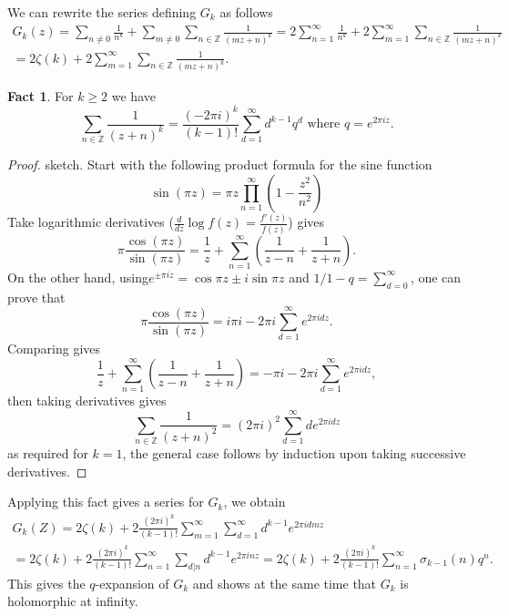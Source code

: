 \documentclass{article}
\theoremstyle{definition}
\newtheorem*{fact}{Fact}
\begin{document}
We can rewrite the series defining $G_k$ as follows
\begin{multline*}
G_k(z) = \sum_{n\ne 0}\frac{1}{n^k} + \sum_{m\ne 0}\sum_{n\in\mathbb{Z}}\frac{1}{(mz+n)^k} = 2\sum_{n=1}^{\infty}\frac{1}{n^k} + 2 \sum_{m=1}^{\infty}\sum_{n\in\mathbb{Z}}\frac{1}{(mz+n)^k} \\
= 2\zeta(k) + 2\sum_{m=1}^{\infty}\sum_{n\in\mathbb{Z}}\frac{1}{(mz+n)^k}.\end{multline*}

\begin{fact}
For $k\ge 2$ we have
\[\sum_{n\in\mathbb{Z}}\frac{1}{(z+n)^k} = \frac{(-2\pi i)^k}{(k-1)!}\sum_{d=1}^{\infty}d^{k-1}q^d\text{ where } q= e^{2\pi i z}.\]
\end{fact}

\begin{proof} sketch.
Start with the following product formula for the sine function
\[\sin(\pi z) = \pi z\prod_{n=1}^{\infty}\left(1-\frac{z^2}{n^2}\right)\]
Take logarithmic derivatives ($\frac{d}{dz}\log f(z) = \frac{f'(z)}{f(z)}$) gives
\[\pi \frac{\cos(\pi z)}{\sin(\pi z)} = \frac{1}{z} + \sum_{n=1}^{\infty}\left(\frac{1}{z-n}+ \frac{1}{z+n}\right).\]
On the other hand, using$e^{\pm \pi i z} = \cos\pi z\pm i\sin \pi z$ and $1/1-q = \sum_{d=0}^{\infty}$, one can prove that 
\[\pi\frac{\cos(\pi z)}{\sin(\pi z)} = i\pi i - 2\pi i \sum_{d=1}^{\infty}e^{2 \pi i dz}.\]
Comparing gives
\[\frac{1}{z} + \sum_{n=1}^{\infty}\left(\frac{1}{z-n} + \frac{1}{z+n}\right) = -\pi i -2\pi i\sum_{d=1}^{\infty}e^{2\pi i d z},\]
then taking derivatives gives
\[\sum_{n\in\mathbb{Z}} \frac{1}{(z+n)^2} = (2\pi i)^2\sum_{d=1}^{\infty}de^{2\pi i dz}\]
as required for $k=1$, the general case follows by induction upon taking successive derivatives.
\end{proof}

Applying this fact gives a series for $G_k$, we obtain
\begin{multline*}
G_k(Z) = 2\zeta(k) + 2\frac{(2\pi i)^k}{(k-1)!}\sum_{m=1}^{\infty}\sum_{d=1}^{\infty}d^{k-1}e^{2 \pi i d m z} \\
= 2\zeta(k) + 2\frac{(2\pi i)^k}{(k-1)!}\sum_{n=1}^\infty\sum_{d|n}d^{k-1}e^{2\pi i n z} =2\zeta(k) + 2\frac{(2\pi i)^k}{(k-1)!}\sum_{n=1}^\infty \sigma_{k-1}(n)q^n.\end{multline*}
This gives the $q$-expansion of $G_k$ and shows at the same time that $G_k$ is holomorphic at infinity.
\end{document}
